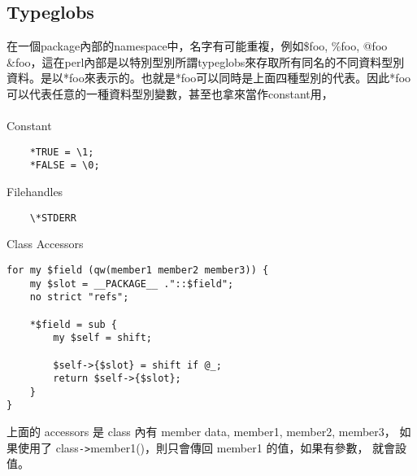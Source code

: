     \subsection{Typeglobs}
    在一個package內部的namespace中，名字有可能重複，例如\$foo, \%foo, @foo
    \&foo，這在perl內部是以特別型別所謂typeglobs來存取所有同名的不同資料型別
    資料。是以*foo來表示的。也就是*foo可以同時是上面四種型別的代表。因此*foo
    可以代表任意的一種資料型別變數，甚至也拿來當作constant用，
    \\\\
    Constant
    \begin{verbatim}
    *TRUE = \1;
    *FALSE = \0;
    \end{verbatim}
    Filehandles
    \begin{verbatim}
    \*STDERR

    \end{verbatim}
    Class Accessors
    \begin{verbatim}
for my $field (qw(member1 member2 member3)) {
    my $slot = __PACKAGE__ ."::$field";
    no strict "refs";

    *$field = sub {
        my $self = shift;

        $self->{$slot} = shift if @_;
        return $self->{$slot};
    }
}
    \end{verbatim}
    上面的 accessors 是 class 內有 member data, member1, member2, member3，
    如果使用了 class\verb=->=member1()，則只會傳回 member1 的值，如果有參數，
    就會設值。
